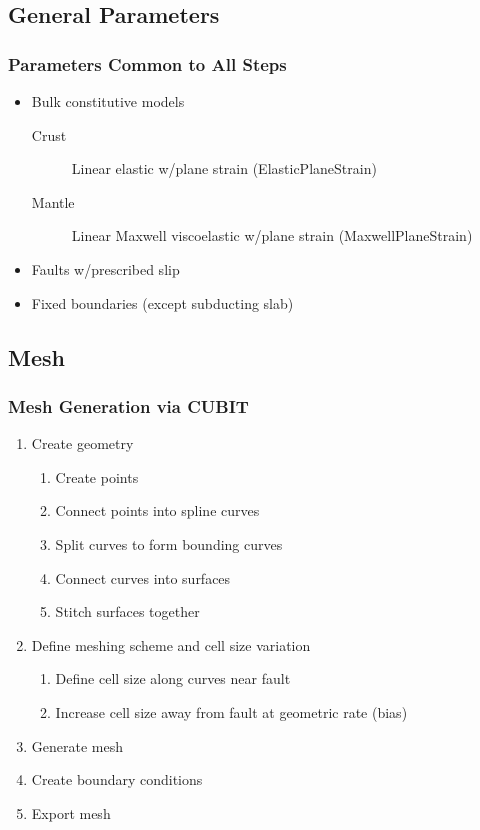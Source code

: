 \documentclass{beamer}
\begin{document}
\subsection{General Parameters}

\begin{frame}
  \frametitle{Parameters Common to All Steps}
  \summary{}
 
  \begin{itemize}
  \item Bulk constitutive models
    \begin{description}
    \item[Crust] Linear elastic w/plane strain (ElasticPlaneStrain)
    \item[Mantle] Linear Maxwell viscoelastic w/plane strain
      (MaxwellPlaneStrain)
    \end{description}
  \item Faults w/prescribed slip
  \item Fixed boundaries (except subducting slab)
  \end{itemize}

\end{frame}


\subsection{Mesh}

\begin{frame}
  \frametitle{Mesh Generation via CUBIT}
 
  \begin{enumerate}
  \item Create geometry
    \begin{enumerate}
    \item Create points
    \item Connect points into spline curves
    \item Split curves to form bounding curves
    \item Connect curves into surfaces
    \item Stitch surfaces together
    \end{enumerate}
  \item Define meshing scheme and cell size variation
    \begin{enumerate}
    \item Define cell size along curves near fault
    \item Increase cell size away from fault at geometric rate (bias)
    \end{enumerate}
  \item Generate mesh
  \item Create boundary conditions
  \item Export mesh
  \end{enumerate}
  
\end{frame}
\end{document}
